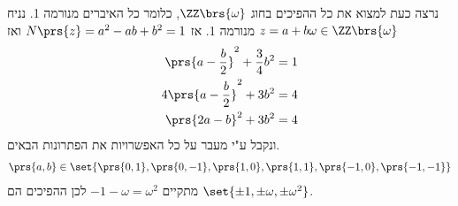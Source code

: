 \documentclass[a4paper,10pt,twoside,openany]{book}
\begin{document}
נרצה כעת למצוא את כל ההפיכים בחוג
$\ZZ\brs{\omega}$,
כלומר כל האיברים מנורמה 1.
נניח
$z = a+b\omega \in \ZZ\brs{\omega}$
מנורמה 1. אז
$N\prs{z} = a^2 - ab + b^2 = 1$
ואז
\begin{align*}
\prs{a-\frac{b}{2}}^2 + \frac{3}{4}b^2 &= 1 \\
4\prs{a-\frac{b}{2}}^2 + 3b^2 &= 4 \\
\prs{2a-b}^2 + 3b^2 &= 4
\end{align*}
ונקבל ע"י מעבר על כל האפשרויות את הפתרונות הבאים.
\begin{align*}
\prs{a,b} \in \set{\prs{0,1},\prs{0,-1}, \prs{1,0}, \prs{1,1}, \prs{-1,0}, \prs{-1,-1}}
\end{align*}
מתקיים
$-1-\omega = \omega^2$
לכן ההפיכים הם
$\set{\pm 1, \pm \omega, \pm \omega^2}$.
\backmatter
\end{document}
